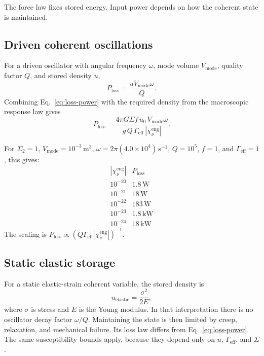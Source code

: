 \documentclass[11pt]{article}
\numberwithin{equation}{section}
\theoremstyle{remark}
\newcommand{\chieng}{\chi_\nu^{\mathrm{eng}}}
\newcommand{\Gammaeff}{\Gamma_{\mathrm{eff}}}
\begin{document}
The force law fixes stored energy. Input power depends on how the coherent state
is maintained.

\subsection{Driven coherent oscillations}

For a driven oscillator with angular frequency \(\omega\), mode volume
\(V_{\mathrm{mode}}\), quality factor \(Q\), and stored density \(u\),
\begin{equation}
P_{\mathrm{loss}}
=
\frac{uV_{\mathrm{mode}}\omega}{Q}.
\label{eq:loss-power}
\end{equation}
Combining Eq.~\eqref{eq:loss-power} with the required density from the
macroscopic response law gives
\begin{equation}
\boxed{
P_{\mathrm{loss}}
=
\frac{4\pi G\Sigma f\,u_0\,V_{\mathrm{mode}}\omega}
{g\,Q\,\Gammaeff\,|\chieng|}.
}
\label{eq:power-bound}
\end{equation}

For \(\Sigma_2=1\),
\(V_{\mathrm{mode}}=10^{-3}\,\mathrm{m^3}\),
\(\omega=2\pi(4.0\times10^4)\,\mathrm{s^{-1}}\),
\(Q=10^5\), \(f=1\), and \(\Gammaeff=1\), this gives:
\[
\begin{array}{c|c}
|\chieng| & P_{\mathrm{loss}}\\
\hline
10^{-20} & 1.8\,\mathrm{W}\\
10^{-21} & 18\,\mathrm{W}\\
10^{-22} & 183\,\mathrm{W}\\
10^{-23} & 1.8\,\mathrm{kW}\\
10^{-24} & 18\,\mathrm{kW}
\end{array}
\]
The scaling is \(P_{\mathrm{loss}}\propto(Q\Gammaeff|\chieng|)^{-1}\).

\subsection{Static elastic storage}

For a static elastic-strain coherent variable, the stored density is
\begin{equation}
u_{\mathrm{elastic}}=\frac{\sigma^2}{2E},
\label{eq:elastic-density}
\end{equation}
where \(\sigma\) is stress and \(E\) is the Young modulus. In that interpretation
there is no oscillator decay factor \(\omega/Q\). Maintaining the state is then
limited by creep, relaxation, and mechanical failure. Its loss law differs from
Eq.~\eqref{eq:loss-power}. The same susceptibility bounds apply, because they
depend only on \(u\), \(\Gammaeff\), and \(\Sigma\).
\end{document}
